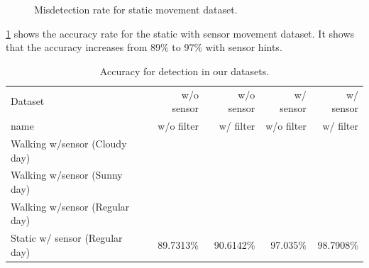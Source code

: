\begin{figure}[!ht]
\centering
{}

\caption{Misdetection rate for static movement dataset.}
\label{f:fp_stat}
\end{figure}

\ref{t:acc_stat} shows the accuracy rate for the static with sensor movement dataset.
It shows that the accuracy increases from 89\% to 97\% with sensor hints.

\begin{table}[h!]
  \centering
  \caption{Accuracy for detection in our datasets.}
  \label{t:acc_stat}
  \begin{tabular}{  l  r  r r r }
    \rowcolor{gray!50}
    Dataset & w/o sensor & w/o sensor & w/ sensor & w/ sensor \\
    \rowcolor{gray!50}
    name & w/o filter & w/ filter & w/o filter & w/ filter \\
    \hline
    Walking w/sensor (Cloudy day) & \\
    Walking w/sensor (Sunny day) &\\
    Walking w/sensor (Regular day) & \\
    Static w/ sensor (Regular day) & 89.7313\% & 90.6142\% & 97.035\% & 98.7908\% \\
    
    \hline
  \end{tabular}
\end{table}


